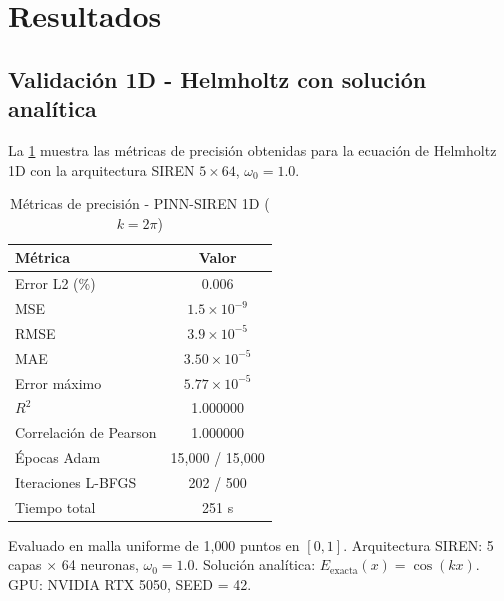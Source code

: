 
\section{Resultados}
\label{sec:resultados}

\subsection{Validación 1D - Helmholtz con solución analítica}
\label{subsec:resultados1d}

La \cref{tab:resultados1d} muestra las métricas de precisión obtenidas para la
ecuación de Helmholtz 1D con la arquitectura SIREN $5\times64$, $\omega_0 = 1.0$.

\begin{table}[htbp]
\centering
\begin{threeparttable}
\caption{Métricas de precisión - PINN-SIREN 1D ($k = 2\pi$)}
\label{tab:resultados1d}
\begin{tabular}{lc}
\toprule
Métrica & Valor \\
\midrule
Error L2 (\%)          & 0.006 \\
MSE                    & $1.5 \times 10^{-9}$ \\
RMSE                   & $3.9 \times 10^{-5}$ \\
MAE                    & $3.50 \times 10^{-5}$ \\
Error máximo           & $5.77 \times 10^{-5}$ \\
$R^2$                  & 1.000000 \\
Correlación de Pearson & 1.000000 \\
\midrule
Épocas Adam            & 15{,}000 / 15{,}000 \\
Iteraciones L-BFGS     & 202 / 500 \\
Tiempo total           & 251 s \\
\bottomrule
\end{tabular}
\begin{tablenotes}
\small
\item Evaluado en malla uniforme de 1{,}000 puntos en $[0,1]$.
      Arquitectura SIREN: 5 capas $\times$ 64 neuronas, $\omega_0 = 1.0$.
      Solución analítica: $E_{\mathrm{exacta}}(x) = \cos(kx)$.
      GPU: NVIDIA RTX 5050, SEED = 42.
\end{tablenotes}
\end{threeparttable}
\end{table}

